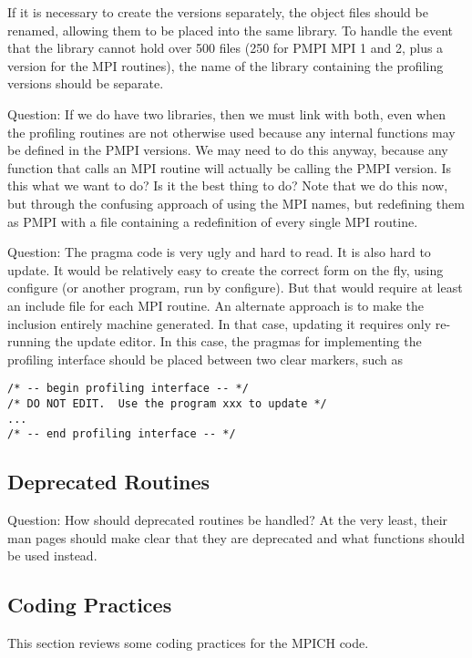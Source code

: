 \documentclass{article}
\begin{document}
If it is necessary to create the  versions separately, the
object files should be renamed, allowing them to be placed into the
same library.  To handle the event that the library cannot hold over
500 files (250 for PMPI MPI 1 and 2, plus a version for the MPI
routines), the name of the library containing the profiling versions
should be separate.

Question: If we do have two libraries, then we must link with both,
even when the profiling routines are not otherwise used because any
internal functions may be defined in the PMPI versions.  We may need
to do this anyway, because any function that calls an MPI routine will
actually be calling the PMPI version.  Is this what we want to do?  Is
it the best thing to do?  Note that we do this now, but through the
confusing approach of using the MPI names, but redefining them as PMPI
with a file containing a redefinition of every single MPI routine.

Question: The pragma code is very ugly and hard to read.  It is also hard to
update.
It would be relatively
easy to create the correct form on the fly, using configure (or
another program, run by configure).  But that
would require at least an include file for each MPI routine.
An alternate approach is to make the inclusion entirely machine
generated.  In that case, updating it requires only re-running the
update editor.  In this case, the pragmas for implementing the
profiling interface should be placed between two clear markers, such
as 
\begin{verbatim}
/* -- begin profiling interface -- */
/* DO NOT EDIT.  Use the program xxx to update */
...
/* -- end profiling interface -- */
\end{verbatim}

\subsection{Deprecated Routines}
Question:  How should deprecated routines be handled?  At the very
least, their man pages should make clear that they are deprecated and
what functions should be used instead.

\subsection{Coding Practices}
This section reviews some coding practices for the MPICH code.
\end{document}
